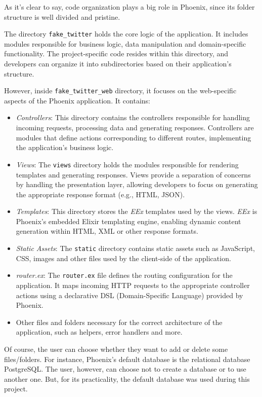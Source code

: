 As it's clear to say, code organization plays a big role in Phoenix, since its folder structure is well divided and pristine. 

The directory \texttt{fake\_twitter} holds the core logic of the application. It includes modules responsible for business logic, data manipulation and domain-specific functionality. The project-specific code resides within this directory, and developers can organize it into subdirectories based on their application's structure.


However, inside \texttt{fake\_twitter\_web} directory, it focuses on the web-specific aspects of the Phoenix application. It contains:

\begin{itemize}
    \item \textit{Controllers}: This directory contains the controllers responsible for handling incoming requests, processing data and generating responses. Controllers are modules that define actions corresponding to different routes, implementing the application's business logic.
    \item \textit{Views}: The \texttt{views} directory holds the modules responsible for rendering templates and generating responses. Views provide a separation of concerns by handling the presentation layer, allowing developers to focus on generating the appropriate response format (e.g., HTML, JSON).
    \item \textit{Templates}: This directory stores the \textit{EEx} templates used by the views. \textit{EEx} is Phoenix's embedded Elixir templating engine, enabling dynamic content generation within HTML, XML or other response formats.
    \item \textit{Static Assets}: The \texttt{static} directory contains static assets such as JavaScript, CSS, images and other files used by the client-side of the application.
    \item \textit{router.ex}: The \texttt{router.ex} file defines the routing configuration for the application. It maps incoming HTTP requests to the appropriate controller actions using a declarative DSL (Domain-Specific Language) provided by Phoenix.
    \item Other files and folders necessary for the correct architecture of the application, such as helpers, error handlers and more.
\end{itemize}

Of course, the user can choose whether they want to add or delete some files/folders. For instance, Phoenix's default database is the relational database PostgreSQL. The user, however, can choose not to create a database or to use another one. But, for its practicality, the default database was used during this project.\newline

